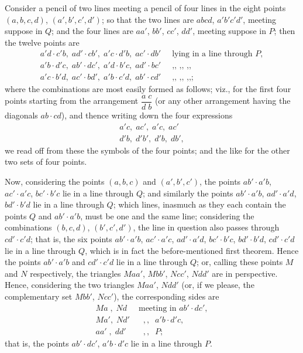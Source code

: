 \documentclass[11pt]{article}
\begin{document}
Consider a pencil of two lines meeting a pencil of four lines in the eight points $(a, b, c, d)$, $(a', b', c', d')$; so that the two lines are $abcd$, $a'b'c'd'$, meeting suppose in $Q$; and the four lines are $aa'$, $bb'$, $cc'$, $dd'$, meeting suppose in $P$; then the twelve points are
\begin{align*}
a'd \cdot c'b,\; ad' \cdot cb',\; a'c \cdot d'b,\; ac' \cdot db'\;\; & \text{lying in a line through } P,\\
a'b \cdot d'c,\; ab' \cdot dc',\; a'd \cdot b'c,\; ad' \cdot bc'\;\; & \text{,, ,, ,,}\\
a'c \cdot b'd,\; ac' \cdot bd',\; a'b \cdot c'd,\; ab' \cdot cd'\;\; & \text{,, ,, ,,;}
\end{align*}
where the combinations are most easily formed as follows; viz., for the first four points starting from the arrangement $\dfrac{a\;c}{d\;b}$ (or any other arrangement having the diagonals $ab \cdot cd$), and thence writing down the four expressions
\[
\begin{array}{l}
a'c,\; ac',\; a'c,\; ac'\\
d'b,\; d'b',\; d'b,\; db',
\end{array}
\]
we read off from these the symbols of the four points; and the like for the other two sets of four points.

Now, considering the points $(a, b, c)$ and $(a', b', c')$, the points $ab' \cdot a'b$, $ac' \cdot a'c$, $bc' \cdot b'c$ lie in a line through $Q$; and similarly the points $ab' \cdot a'b$, $ad' \cdot a'd$, $bd' \cdot b'd$ lie in a line through $Q$; which lines, inasmuch as they each contain the points $Q$ and $ab' \cdot a'b$, must be one and the same line; considering the combinations $(b, c, d)$, $(b', c', d')$, the line in question also passes through $cd' \cdot c'd$; that is, the six points $ab' \cdot a'b$, $ac' \cdot a'c$, $ad' \cdot a'd$, $bc' \cdot b'c$, $bd' \cdot b'd$, $cd' \cdot c'd$ lie in a line through $Q$, which is in fact the before-mentioned first theorem. Hence the points $ab' \cdot a'b$ and $cd' \cdot c'd$ lie in a line through $Q$; or, calling these points $M$ and $N$ respectively, the triangles $Maa'$, $Mbb'$, $Ncc'$, $Ndd'$ are in perspective. Hence, considering the two triangles $Maa'$, $Ndd'$ (or, if we please, the complementary set $Mbb'$, $Ncc'$), the corresponding sides are
\begin{align*}
Ma\;,\; Nd \;&\text{meeting in } ab' \cdot dc',\\
Ma',\; Nd' \;&\;\; ,, \;\; a'b \cdot d'c,\\
aa'\;,\; dd' \;&\;\; ,, \;\; P;
\end{align*}
that is, the points $ab' \cdot dc'$, $a'b \cdot d'c$ lie in a line through $P$.
\end{document}
